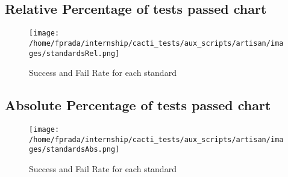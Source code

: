 \documentclass{article}
\begin{document}
\subsection{Relative Percentage of tests passed chart}
\begin{figure}[h!]
\centering
\texttt{[image: /home/fprada/internship/cacti\_tests/aux\_scripts/artisan/images/standardsRel.png]}
\caption{Success and Fail Rate for each standard}
\label{fig:standards}
\end{figure}
\subsection{Absolute Percentage of tests passed chart}
\begin{figure}[h!]
\centering
\texttt{[image: /home/fprada/internship/cacti\_tests/aux\_scripts/artisan/images/standardsAbs.png]}
\caption{Success and Fail Rate for each standard}
\label{fig:standards}
\end{figure}
\end{document}
